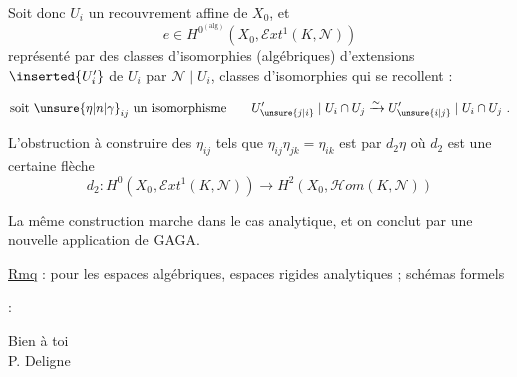 \noindent Soit donc \(U_i\) un recouvrement affine de \(X_0\), et
\[
 e\in H^{0^{(\mathrm{alg})}}(X_0,\mathscr{E}xt^1(K,\mathscr{N}))
\]
représenté par des classes d'isomorphies (algébriques) d'extensions \(\inserted{U'_i}\) de \(U_i\) par \(\mathscr{N}\mid U_i\), classes d'isomorphies qui se recollent :

\[
 \text{soit }\unsure{\eta|n|\gamma}_{ij}\text{ un isomorphisme}\qquad
 U'_{\unsure{j|i}}\mid U_i\cap U_j
 \xrightarrow{\sim}
 U'_{\unsure{i|j}}\mid U_i\cap U_j\ .
\]

L'obstruction à construire des \(\eta_{ij}\) tels que \(\eta_{ij}\eta_{jk}=\eta_{ik}\) est  par \(d_2\eta\) où \(d_2\) est une certaine flèche
\[
 d_2:H^0(X_0,\mathscr{E}xt^1(K,\mathscr{N}))\longrightarrow
 H^2(X_0,\mathscr{H}om(K,\mathscr{N}))
\]

La même construction marche dans le cas analytique, et on conclut par une nouvelle application de GAGA.

\uline{Rmq}  :  pour les espaces algébriques, espaces rigides analytiques ; schémas formels

 :

\noindent\hfill Bien à toi\\
\null\hfill P. Deligne\\
\margin{\unsure{:}}
\clearpage
